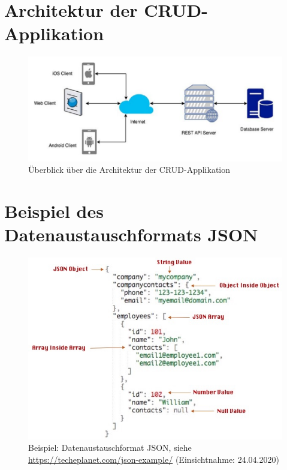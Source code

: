 \documentclass[a4paper,titlepage,halfparskip,12pt,listof=numbered]{scrreprt}
\begin{document}
\chapter{Architektur der CRUD-Applikation}
\label{chap:ArchitekturCRUDapp}

\begin{figure}[h]
	\centering
	\includegraphics[width=\linewidth]{images/ArchitectureCRUDapp}
	\caption{Überblick über die Architektur der CRUD-Applikation \cite[S.6]{pythonFlaskREST}}
	\label{img:ArchitectureCRUDapp}
\end{figure}

\chapter{Beispiel des Datenaustauschformats \ac{JSON}}

\begin{figure}[h]
	\centering
	\includegraphics[width=\linewidth]{images/json-example}
	\caption{Beispiel: Datenaustauschformat JSON, siehe \url{https://techeplanet.com/json-example/} (Einsichtnahme: 24.04.2020)}
	\label{img:ExampleJSON}
\end{figure}
\end{document}
